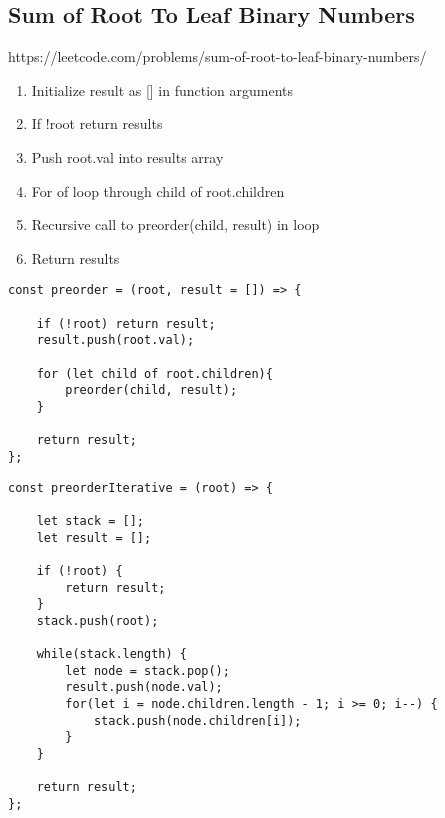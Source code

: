 \documentclass[10pt]{article}
\begin{document}
\medskip %
















\pagebreak
\medskip   
\subsection{Sum of Root To Leaf Binary Numbers}
https://leetcode.com/problems/sum-of-root-to-leaf-binary-numbers/

\begin{enumerate}
	\item Initialize result as [] in function arguments
	\item If !root return results 
	\item Push root.val into results array
	\item For of loop through child of root.children
	\item Recursive call to preorder(child, result) in loop
	\item Return results
\end{enumerate}



\begin{lstlisting}[title=Solution preorder recursive, captionpos=t]
const preorder = (root, result = []) => {
    
    if (!root) return result;
    result.push(root.val);
    
    for (let child of root.children){
        preorder(child, result);
    }
    
    return result;
};
\end{lstlisting}



\begin{lstlisting}[title=Solution preorderIterative, captionpos=t]
const preorderIterative = (root) => {

    let stack = [];
    let result = [];

    if (!root) {
        return result;
    }
    stack.push(root);

    while(stack.length) {
        let node = stack.pop();
        result.push(node.val);
        for(let i = node.children.length - 1; i >= 0; i--) {
            stack.push(node.children[i]);
        }
    }

    return result;
};
\end{lstlisting}
\end{document}
